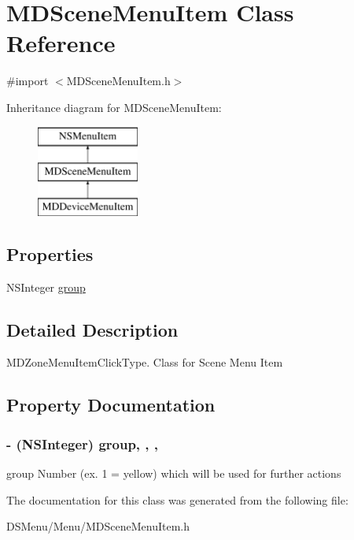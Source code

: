 \hypertarget{interface_m_d_scene_menu_item}{\section{M\-D\-Scene\-Menu\-Item Class Reference}
\label{interface_m_d_scene_menu_item}
}


{\ttfamily \#import $<$M\-D\-Scene\-Menu\-Item.\-h$>$}

Inheritance diagram for M\-D\-Scene\-Menu\-Item\-:\begin{figure}[H]
\begin{center}
\leavevmode
\includegraphics[height=3.000000cm]{interface_m_d_scene_menu_item}
\end{center}
\end{figure}
\subsection*{Properties}
\begin{DoxyCompactItemize}
\item 
N\-S\-Integer \hyperlink{interface_m_d_scene_menu_item_aa65f24d6bf8e466abdb0d32ee07b3c44}{group}
\end{DoxyCompactItemize}


\subsection{Detailed Description}
M\-D\-Zone\-Menu\-Item\-Click\-Type. Class for Scene Menu Item 

\subsection{Property Documentation}
\hypertarget{interface_m_d_scene_menu_item_aa65f24d6bf8e466abdb0d32ee07b3c44}{
\subsubsection[{group}]{\setlength{\rightskip}{0pt plus 5cm}-\/ (N\-S\-Integer) group\hspace{0.3cm}{\ttfamily [read]}, {\ttfamily [write]}, {\ttfamily [atomic]}, {\ttfamily [assign]}}}\label{interface_m_d_scene_menu_item_aa65f24d6bf8e466abdb0d32ee07b3c44}
group Number (ex. 1 = yellow) which will be used for further actions 

The documentation for this class was generated from the following file\-:\begin{DoxyCompactItemize}
\item 
D\-S\-Menu/\-Menu/M\-D\-Scene\-Menu\-Item.\-h\end{DoxyCompactItemize}
